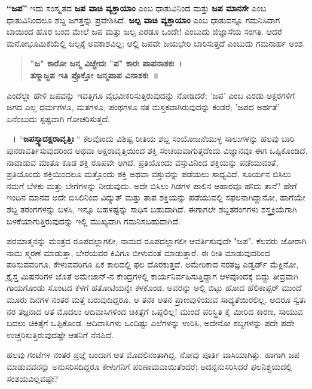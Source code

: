 \textbf{“ಜಪ”} ಇದು ಸಂಸ್ಕೃತದ \textbf{ಜಪ ವಾಚಿ ವ್ಯಕ್ತಾಯಾಂ} ಎಂಬ ಧಾತುವಿನಿಂದ ಮತ್ತು \textbf{ಜಪ ಮಾನಸೇ} ಎಂಬ ಧಾತುವಿನಿಂದಲೂ ಶಬ್ದ ಜಗತ್ತನ್ನು ಪ್ರವೇಶಿಸಿದೆ. \textbf{ಜಲ್ಪ ವಾಚಿ ವ್ಯಕ್ತಾಯಾಂ} ಎಂಬ ಧಾತುವನ್ನೂ ಗಮನಿಸಿದಾಗ ಬಾಯಿಂದ ಹೊರ ಬಂದ ಮೇಲೆ ಜಪ ಮತ್ತು ಜಲ್ಪ ಎರಡೂ ಒಂದೇ! ಎಂಬುದು ಜಿಜ್ಞಾಸೆಯ ಸಂಗತಿ. ಆದರೆ ಮನೋಭೂಮಿಕೆಯೆಲ್ಲಿ ಜಲ್ಪಕ್ಕೆ ಅವಕಾಶವಿಲ್ಲ; ಅಲ್ಲಿ ಜಪವೇ ಜಯಭೇರಿ ಬಾರಿಸುತ್ತದೆ ಎಂಬುದು ಗಮನಾರ್ಹ ಅಂಶ.
\begin{verse}
\textbf{"ಜ" ಕಾರೋ ಜನ್ಮ ವಿಚ್ಚೇದಃ "ಪ" ಕಾರಃ ಪಾಪನಾಶಕಃ~। \\
ತಸ್ಮಾಜ್ಜಪ ಇತಿ ಪ್ರೊಕ್ತೋ ಜನ್ಮಪಾಪ ವಿನಾಶಕಃ~॥}
\end{verse}
ಎಂದೆಲ್ಲಾ ಹೇಳಿ ಜಪವನ್ನು ಇವತ್ತಿಗೂ ವೈಭವೀಕರಿಸುತ್ತಿರುವುದನ್ನು ನೋಡಿದರೆ; ’ಜಪ’ ಎಂಬ ಎರಡು ಅಕ್ಷರಗಳಿಗೆ ಜಗದ ಎಲ್ಲ ಧರ್ಮಗಳೂ, ಮತಗಳೂ, ಪಂಥಗಳೂ ನತ ಮಸ್ತಕವಾಗಿರುವುದನ್ನು ಕಂಡರೆ; ’ಜಪದ ಅರ್ಹತೆ’ ಏನೆಂಬುದು ಸ್ಪಷ್ಟವಾಗಿ ಗೋಚರಿಸುತ್ತದೆ.

~। “\textbf{ಜಪಸ್ಸ್ಯಾದಕ್ಷರಾವೃತ್ತಿಃ} “ ಕೆಲವೊಂದು ವಿಶಿಷ್ಟ ರೀತಿಯ ಶಬ್ದ ಸಂಯೋಜನೆಯುಳ್ಳ ಸಾಲುಗಳನ್ನು ಹಲವು ಬಾರಿ ಪುನರಾವರ್ತಿಸುವುದರಿಂದ ಅಥವಾ ಅಕ್ಷರಾವೃತ್ತಿಯಿಂದ ಶಕ್ತಿ ಸಂಚಯವಾಗುತ್ತದೆಂದು ವಿಜ್ಞಾನವೂ ಈಗ ಒಪ್ಪಿಕೊಂಡಿದೆ. ನಾವಾಡುವ ಮಾತೂ ಕೂಡ ಶಕ್ತಿ ರೂಪವೇ ಆಗಿದೆ. ಪ್ರತಿಯೊಂದು ವಸ್ತುವಿನಿಂದ ಶಕ್ತಿಯನ್ನು ಪಡೆಯುವಂತೆ, ಪ್ರತಿಯೊಂದು ಶಕ್ತಿಯಿಂದಲೂ ಮತ್ತೊಂದು ಶಕ್ತಿ ಅಥವಾ ವಸ್ತುವನ್ನು ಪಡೆಯಲು ಸಾಧ್ಯವಿದೆ. ಸೂರ್ಯನ ಬಿಸಿಲು ನಮಗೆ ಬೆಳಕು ಮತ್ತು ಬೇಗೆಗಳನ್ನು ನೀಡುವುದು. ಅದೇ ಬಿಸಿಲು ಗಿಡಗಳ ಪಾಲಿನ ಆಹಾರವೂ ಹೌದು ತಾನೆ? ಹೇಗೆ ಇಂದಿನ ಮಾನವ ಅದೇ ಬಿಸಿಲಿನಿಂದ ವಿದ್ಯುತ್ ಮತ್ತು ತಾಪ ಶಕ್ತಿಯನ್ನು ಪಡೆಯುವಲ್ಲಿ ಸಫಲನಾಗಿದ್ದಾನೋ, ಹಾಗೆಯೇ ಶಬ್ದ ತರಂಗಗಳನ್ನು ಬಳಸಿ, ಇನ್ನೂ ಬಹಳಷ್ಟನ್ನು ಸಾಧಿಸ ಬಹುದಾಗಿದೆ. ಈಗಾಗಲೇ ಶಬ್ದತರಂಗಗಳು ಶಸ್ತ್ರಕ್ರಿಯೆಗಾಗಿ ಬಳಕೆಯಾಗುತ್ತಿರುವುದನ್ನು ಇಲ್ಲಿ ಮುಖ್ಯವಾಗಿ ಗಮನಿಸಬಹುದಾಗಿದೆ.

ಪರಮಾತ್ಮನನ್ನು ಮಂತ್ರದ ರೂಪದಲ್ಲಾಗಲೀ, ನಾಮದ ರೂಪದಲ್ಲಾಗಲೀ ಆವರ್ತಿಸುವುದೇ "ಜಪ". ಕೆಲವರು ಜೋರಾಗಿ ನಾಮ ಸ್ಮರಣೆ ಮಾಡುತ್ತಾ, ಬೇರೆಯವರ ಕಿವಿಗೂ ಬೀಳುವಂತೆ ಮಾಡುತ್ತಾರೆ. ಈ ರೀತಿ ಮಾಡುವುದರಿಂದ ಪಠಿಸುವವರಿಗೂ, ಕೇಳುವವರಿಗೂ ಏಕ ಕಾಲದಲ್ಲಿ ಫಲ ದೊರಕುತ್ತದೆ. ಅಮೇರಿಕಾದ ನರತಜ್ಞ ಎಡ್ವರ್ಡ್ ಮೆಕ್ಲಿನೋ, ಕ್ರೈಸ್ತ ಮಿಷನರಿಗಳ ಜೊತೆ ಅಮೇಜಾನ್-ನ ಕೇಂದ್ರಗಳಲ್ಲಿ ಕಾರ್ಯನಿರ್ವಹಿಸುತ್ತಿದ್ದಾಗ ಆಳವೊಂದಕ್ಕೆ ಬಿದ್ದು ತೀವ್ರವಾಗಿ ಗಾಯಗೊಂಡು ಸೊಂಟದ ಕೆಳಗೆ ಹತೋಟಿಯನ್ನೇ ಕಳಕೊಂಡ. ಅವರನ್ನು ಅಲ್ಲಿ ಬಿಟ್ಟು ಹೋದ ಹೆಲಿಕಾಪ್ಟರ್ ಮುಂದೆ ಮೂರು ದಿನಗಳ ನಂತರ ಮತ್ತೆ ಬರುವುದಿದ್ದರೂ, ಆ ತನಕ ಆತನ ಪ್ರಾಣವುಳಿಯುವ ಸಾಧ್ಯತೆಯಿರಲಿಲ್ಲ. ಆದರೂ ಸ್ವತಃ ನರ ತಜ್ಞನಾದ ಆತ ಮೊದಲು ಆದಿವಾಸಿಗಳಿಂದ ಚಿಕಿತ್ಸೆಗೆ ಒಪ್ಪಲಿಲ್ಲ! ಮುಂದೆ ಪರಿಸ್ಥಿತಿ ಕೈ ಮೀರಿದ ಕಾರಣ, ಸಾಯುವ ಬದಲು ಚಿಕಿತ್ಸೆಗೆ ಒಪ್ಪಿಕೊಂಡ. ಆದಿವಾಸಿಗಳು ಒಂದಿಷ್ಟು ಎಲೆಗಳನ್ನು ಉರಿಸಿ, ಅದೇನೋ ಶಬ್ದಗಳನ್ನು ಪದೇ ಪದೇ ಉಚ್ಚರಿಸುತ್ತಿರುವುದಷ್ಟೇ ಆತನಿಗೆ ನೆನಪಿದೆ. 

ಹಲವು ಗಂಟೆಗಳ ನಂತರ ಪ್ರಜ್ಞೆ ಬಂದಾಗ ಆತ ಮೊದಲಿನಂತಾಗಿದ್ದ. ನೋವು ಪೂರ್ತಿ ವಾಸಿಯಾಗಿತ್ತು. ಹಾಗಾಗಿ ಜಪ ಮಾಡುವವನನ್ನು ಅನುಸರಿಸದಿದ್ದರೂ ಕೇಳುಗನಿಗೆ ಪರಿಣಾಮವಾಯಿತೆಂದರೆ; ಅದನ್ನನುಸರಿಸಿದರೆ ಫಲನಿಶ್ಚಯದಲ್ಲಿ ಸಂಶಯವಿಲ್ಲವಷ್ಟೇ?

